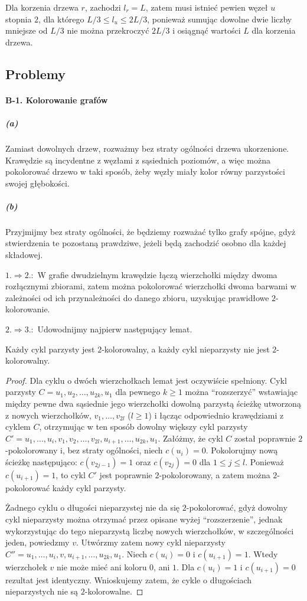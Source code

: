 Dla korzenia drzewa $r$, zachodzi $l_r=L$, zatem musi istnieć pewien węzeł $u$ stopnia $2$, dla którego $L/3\le l_u\le 2L/3$, ponieważ sumując dowolne dwie liczby mniejsze od $L/3$ nie można przekroczyć $2L/3$ i osiągnąć wartości $L$ dla korzenia drzewa.

\subsection*{Problemy}

\paragraph{B-1. Kolorowanie grafów}
\subparagraph{(a)}
Zamiast dowolnych drzew, rozważmy bez straty ogólności drzewa ukorzenione. Krawędzie są incydentne z węzłami z sąsiednich poziomów, a więc można pokolorować drzewo w taki sposób, żeby węzły miały kolor równy parzystości swojej głębokości.

\subparagraph{(b)}
Przyjmijmy bez straty ogólności, że będziemy rozważać tylko grafy spójne, gdyż stwierdzenia te pozostaną prawdziwe, jeżeli będą zachodzić osobno dla każdej składowej.
\bigskip

$1.\Rightarrow 2.\!\!:$ W grafie dwudzielnym krawędzie łączą wierzchołki między dwoma rozłącznymi zbiorami, zatem można pokolorować wierzchołki dwoma barwami w zależności od ich przynależności do danego zbioru, uzyskując prawidłowe \mbox{$2$-kolorowanie}.
\bigskip

$2.\Rightarrow 3.\!\!:$ Udowodnijmy najpierw następujący lemat.
\begin{lemat*}
	Każdy cykl parzysty jest $2$-kolorowalny, a każdy cykl nieparzysty nie jest $2$-kolorowalny.
\end{lemat*}
\begin{proof}
Dla cyklu o dwóch wierzchołkach lemat jest oczywiście spełniony. Cykl parzysty $C = u_1,u_2,\dots,u_{2k},u_1$ dla pewnego $k\ge 1$ można ``rozszerzyć'' wstawiając między pewne dwa sąsiednie jego wierzchołki dowolną parzystą ścieżkę utworzoną z nowych wierzchołków, $v_1,\dots,v_{2l}$ ($l\ge 1$) i łącząc odpowiednio krawędziami z cyklem $C$, otrzymując w ten sposób dowolny większy cykl parzysty $C' = u_1,\dots,u_i,v_1,v_2,\dots,v_{2l},u_{i+1},\dots,u_{2k},u_1$. Załóżmy, że cykl $C$ został poprawnie \mbox{$2$-pokolorowany} i, bez straty ogólności, niech $c(u_i)=0$. Pokolorujmy nową ścieżkę następująco: $c(v_{2j-1})=1$ oraz $c(v_{2j})=0$ dla $1\le j\le l$. Ponieważ $c(u_{i+1})=1$, to cykl $C'$ jest poprawnie $2$-pokolorowany, a zatem można $2$-pokolorować każdy cykl parzysty.

Żadnego cyklu o długości nieparzystej nie da się $2$-pokolorować, gdyż dowolny cykl nieparzysty można otrzymać przez opisane wyżej ``rozszerzenie'', jednak wykorzystując do tego nieparzystą liczbę nowych wierzchołków, w szczególności jeden, powiedzmy $v$. Utwórzmy zatem nowy cykl nieparzysty $C'' = u_1,\dots,u_i,v,u_{i+1},\dots,u_{2k},u_1$. Niech $c(u_i)=0$ i $c(u_{i+1})=1$. Wtedy wierzchołek $v$ nie może mieć ani koloru $0$, ani $1$. Dla $c(u_i)=1$ i $c(u_{i+1})=0$ rezultat jest identyczny. Wnioskujemy zatem, że cykle o długościach nieparzystych nie są $2$-kolorowalne.
\end{proof}


